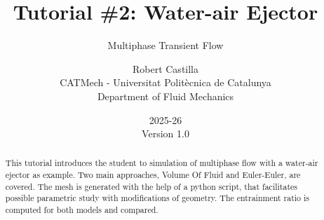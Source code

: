 \documentclass[
    parskip=half,      %
    DIV=12,            %
    headings=normal,   %
    fontsize=11pt,     %
    english            %
]{scrartcl}
\begin{document}
\title{Tutorial \#2: Water-air Ejector}
\subtitle{Multiphase Transient Flow}
\subject{Workshop on Computational Fluid Dynamics (CFD) \\ with OpenFOAM \\ IMP-PAN Gda\'nsk}
\author{Robert Castilla \\ CATMech - Universitat Politècnica de Catalunya \\ Department of Fluid Mechanics}
\date{2025-26 \\ Version 1.0}



\maketitle

\begin{abstract}
This tutorial introduces the student to simulation of multiphase flow with a water-air ejector
as example. Two main approaches, Volume Of Fluid and Euler-Euler, are covered. The mesh is 
generated with the help of a python script, that facilitates possible parametric
study with modifications of geometry.  The entrainment 
ratio is computed for both models and compared.
\end{abstract}

\tableofcontents
\newpage

\end{document}

